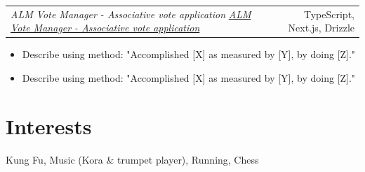 \documentclass[a4paper,10pt]{article}
\makeatletter
\newcommand{\embd}[1]{{\fontseries{sb}\selectfont #1}}
\newcommand{\emsb}[1]{{\fontseries{sb}\selectfont #1}}
\newcommand{\resumeItemText}[1]{%
    {\small #1}\par%
}
\newcommand{\resumeItemListStart}{%
    \begin{itemize}[%
        label={\scriptsize$\bullet$},%
        leftmargin=1.5em,%
        itemsep=1pt,%
        topsep=0pt,%
        partopsep=0pt,%
        parsep=0pt%
    ]%
}
\newcommand{\resumeItemListEnd}{\end{itemize}}
\newcommand{\resumeItem}[1]{\item\small{#1}}
\newcommand{\resumeDescListStart}{%
    \begin{itemize}[%
        leftmargin=0pt,%
        label={},%
        itemsep=2pt,%
        topsep=0pt,%
        partopsep=0pt,%
        parsep=0pt%
    ]%
}
\newcommand{\resumeDescListEnd}{\end{itemize}}
\newcommand{\resumeItemWithDesc}[2]{%
    \item{\emsb{\small #1}{\small : #2}}%
}
\newcommand{\resumeProject}[3][]{%
    \begin{tabular*}{\textwidth}[t]{l@{\extracolsep{\fill}}r}%
        \ifstrempty{#1}%
            {\embd{\small \textit{#2}}}%
            {\embd{\small \textit{\href{#1}{#2}}}\hspace{0.3em}\scalebox{0.7}{\faExternalLink*}}%
        & {\small #3}%
    \end{tabular*}%
}
\newcommand{\sectionGap}{\vspace{6pt}}
\newcommand{\innerSectionGap}{\vspace{10pt}}
\makeatother
\begin{document}
\innerSectionGap

\resumeProject{ALM Vote Manager - Associative vote application}{TypeScript, Next.js, Drizzle}
\resumeItemListStart
    \resumeItem{Describe using method: "Accomplished [X] as measured by [Y], by doing [Z]."}
    \resumeItem{Describe using method: "Accomplished [X] as measured by [Y], by doing [Z]."}
\resumeItemListEnd

\sectionGap





\section{Interests}
\resumeItemText{Kung Fu, Music (Kora \& trumpet player), Running, Chess}
\end{document}
